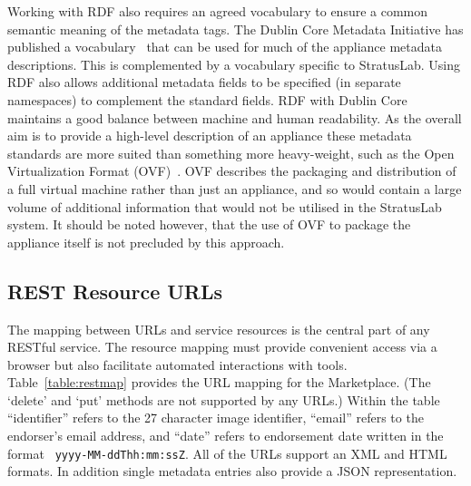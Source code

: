 Working with RDF also requires an agreed vocabulary to ensure a common
semantic meaning of the metadata tags.  The Dublin Core Metadata
Initiative has published a vocabulary~\cite{dcterms} that can be used
for much of the appliance metadata descriptions.  This is complemented by
a vocabulary specific to StratusLab.  Using RDF also allows additional
metadata fields to be specified (in separate namespaces) to complement
the standard fields. RDF with Dublin Core maintains a good balance between machine 
and human readability. As the overall aim is to provide a high-level description 
of an appliance these metadata standards are more suited than something more heavy-weight, 
such as the Open Virtualization Format (OVF)~\cite{ovf}. OVF describes 
the packaging and distribution of a full virtual machine rather than just an appliance, 
and so would contain a large volume of additional information that would 
not be utilised in the StratusLab system. It should be noted however, that 
the use of OVF to package the appliance itself is not precluded by this approach. 

\subsection{REST Resource URLs}

The mapping between URLs and service resources is the central part of
any RESTful service.  The resource mapping must provide convenient
access via a browser but also facilitate automated interactions with
tools.  Table~\ref{table:restmap} provides the URL mapping for the
Marketplace.  (The `delete' and `put' methods are not supported by any
URLs.)  Within the table ``identifier'' refers to the 27 character
image identifier, ``email'' refers to the endorser's email address,
and ``date'' refers to endorsement date written in the format {\tt
  yyyy-MM-ddThh:mm:ssZ}.  All of the URLs support an
XML and HTML formats.  In addition single metadata entries also 
provide a JSON representation.

